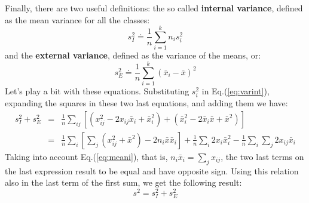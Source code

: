 \documentclass[10pt]{article}
\def\defas{\doteq}
\begin{document}
Finally, there are two useful definitions: the so called
\textbf{internal variance}, defined as the mean variance for all the
classes:
%
\begin{equation}
  \label{eq:varint}
  s_I^2 \defas \frac{1}{n} \sum_{i=1}^k n_i s_i^2
\end{equation}
%
and the \textbf{external variance}, defined as the variance of the
means, or:
%
\begin{equation}
  \label{eq:varext}
  s_E^2 \defas \frac{1}{n} \sum_{i=1}^k \left(\bar{x}_i-\bar{x}\right)^2
\end{equation}
%
Let's play a bit with these equations. Substituting $s_i^2$ in
Eq.(\ref{eq:varint}), expanding the squares in these two last
equations, and adding them we have:
%
\begin{eqnarray}
  \label{eq:proof1}
  s_I^2 + s_E^2 &=& \frac{1}{n} \sum_{ij} 
  \left[\left( x_{ij}^2 - 2 x_{ij} \bar{x}_i + \bar{x}_i^2 \right) +
    \left( \bar{x}_i^2 - 2 \bar{x}_i\bar{x} + \bar{x}^2 \right) \right] \\
  &=& \frac{1}{n} \sum_i \left[ \sum_j \left(x_{ij}^2+\bar{x}^2 \right) 
    - 2 n_i \bar{x} \bar{x}_i \right] +
  \frac{1}{n} \sum_i 2 x_i \bar{x}_i^2 - \frac{1}{n} \sum_i \sum_j 2 x_{ij} \bar{x}_i
\end{eqnarray}
%
Taking into account Eq.(\ref{eq:meani}), that is, $n_i \bar{x}_i = \sum_j
x_{ij}$, the two last terms on the last expression result to be equal
and have opposite sign. Using this relation also in the last term of
the first sum, we get the following result:
%
\begin{equation}
  \label{eq:variances}
  s^2 = s_I^2 + s_E^2
\end{equation}
\end{document}
